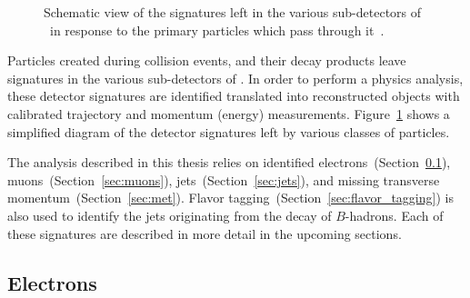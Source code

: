 \begin{figure}[ht]
  \caption{
    Schematic view of the signatures left in the various sub-detectors of
    \atlas\ in response to the primary particles which pass through
    it~\cite{Pequenao:1505342}.
  }
  \label{fig:particle_signatures}
\end{figure}

Particles created during collision events, and their decay products leave
signatures in the various sub-detectors of \atlas.
In order to perform a physics analysis, these detector signatures are identified
translated into reconstructed objects with calibrated trajectory and
momentum (energy) measurements.
Figure~\ref{fig:particle_signatures} shows a simplified diagram of the
detector signatures left by various classes of particles.

The analysis described in this thesis relies on identified
electrons~(Section~\ref{sec:electrons}), muons~(Section~\ref{sec:muons}),
jets~(Section~\ref{sec:jets}), and missing transverse
momentum~(Section~\ref{sec:met}).
Flavor tagging~(Section~\ref{sec:flavor_tagging}) is also used to identify the
jets originating from the decay of $B$-hadrons.
Each of these signatures are described in more detail in the upcoming sections.

\FloatBarrier
\subsection{Electrons} 
\label{sec:electrons}

